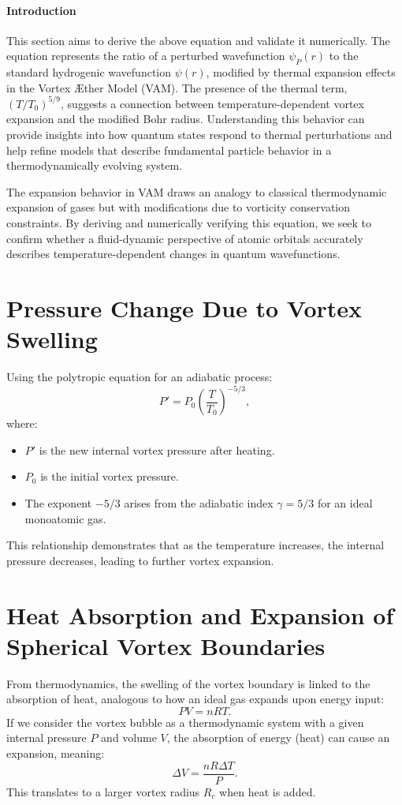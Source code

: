 \documentclass[a4paper,10pt]{article}
\begin{document}
  \paragraph*{Introduction}
  This section aims to derive the above equation and validate it numerically. The equation represents the ratio of a perturbed wavefunction $\psi_P(r)$ to the standard hydrogenic wavefunction $\psi(r)$, modified by thermal expansion effects in the Vortex Æther Model (VAM). The presence of the thermal term, $(T/T_0)^{5/9}$, suggests a connection between temperature-dependent vortex expansion and the modified Bohr radius. Understanding this behavior can provide insights into how quantum states respond to thermal perturbations and help refine models that describe fundamental particle behavior in a thermodynamically evolving system.

  The expansion behavior in VAM draws an analogy to classical thermodynamic expansion of gases but with modifications due to vorticity conservation constraints. By deriving and numerically verifying this equation, we seek to confirm whether a fluid-dynamic perspective of atomic orbitals accurately describes temperature-dependent changes in quantum wavefunctions.

  \section{Pressure Change Due to Vortex Swelling}
  Using the polytropic equation for an adiabatic process:
  \begin{equation*}
    P' = P_0 \left( \frac{T}{T_0} \right)^{-5/3},
  \end{equation*}
  where:
  \begin{itemize}
    \item $P'$ is the new internal vortex pressure after heating.
    \item $P_0$ is the initial vortex pressure.
    \item The exponent $-5/3$ arises from the adiabatic index $\gamma = 5/3$ for an ideal monoatomic gas.
  \end{itemize}
  This relationship demonstrates that as the temperature increases, the internal pressure decreases, leading to further vortex expansion.

  \section{Heat Absorption and Expansion of Spherical Vortex Boundaries}
  From thermodynamics, the swelling of the vortex boundary is linked to the absorption of heat, analogous to how an ideal gas expands upon energy input:
  \begin{equation*}
    PV = nRT.
  \end{equation*}
  If we consider the vortex bubble as a thermodynamic system with a given internal pressure $P$ and volume $V$, the absorption of energy (heat) can cause an expansion, meaning:
  \begin{equation*}
    \Delta V = \frac{nR \Delta T}{P}.
  \end{equation*}
  This translates to a larger vortex radius $R_c$ when heat is added.
\end{document}
